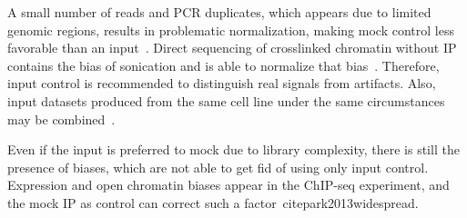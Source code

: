  A small number of reads and PCR duplicates, which appears due to limited genomic regions, results in problematic normalization, making mock control less favorable than an input~\cite{kidder2011chip}. 
 Direct sequencing of crosslinked chromatin without IP contains the bias of sonication and is able to normalize that bias~\cite{kharchenko2008design}. 
 Therefore, input control is recommended to distinguish real signals from artifacts. 
 Also, input datasets produced from the same cell line under the same circumstances may be combined~\cite{meyer2014identifying}.

 Even if the input is preferred to mock due to library complexity, there is still the presence of biases, which are not able to get fid of using only input control. 
 Expression and open chromatin biases appear in the ChIP-seq experiment, and the mock IP as control can correct such a factor~cite{park2013widespread}.


